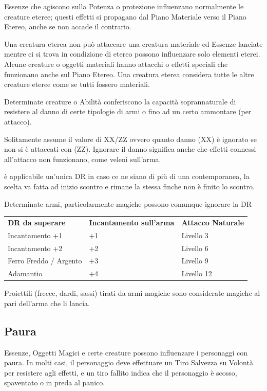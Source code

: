 \documentclass[a4paper,11pt,twoside,openany]{book}
\begin{document}
Essenze che agiscono sulla Potenza o protezione influenzano normalmente le creature eteree; questi effetti si propagano dal Piano Materiale verso il Piano Etereo, anche se non accade il contrario.

Una creatura eterea non può attaccare una creatura materiale ed Essenze lanciate mentre ci si trova in condizione di etereo possono influenzare solo elementi eterei. Alcune creature o oggetti materiali hanno attacchi o effetti speciali che funzionano anche sul Piano Etereo. Una creatura eterea considera tutte le altre creature eteree come se tutti fossero materiali.


Determinate creature o Abilità conferiscono la capacità soprannaturale di resistere al danno di certe tipologie di armi o fino ad un certo ammontare (per attacco).

Solitamente assume il valore di XX/ZZ ovvero quanto danno (XX) è ignorato se non si è attaccati con (ZZ). Ignorare il danno significa anche che effetti connessi all'attacco non funzionano, come veleni sull'arma.

è applicabile un'unica DR in caso ce ne siano di più di una contemporanea, la scelta va fatta ad inizio scontro e rimane la stessa finche non è finito lo scontro.

Determinate armi, particolarmente magiche possono comunque ignorare la DR 

\bigskip

\begin{tabular}{lll}
	\toprule
	\textbf{DR da superare} & \textbf{Incantamento sull'arma} & \textbf{Attacco Naturale}\tabularnewline
	Incantamento +1         & +1                              & Livello 3\tabularnewline
	Incantamento +2         & +2                              & Livello 6\tabularnewline
	Ferro Freddo / Argento  & +3                              & Livello 9\tabularnewline
	Adamantio               & +4                              & Livello 12\tabularnewline
\end{tabular}

Proiettili (frecce, dardi, sassi) tirati da armi magiche sono considerate
magiche al pari dell'arma che li lancia.



\subsection{Paura}

\label{paura}

Essenze, Oggetti Magici e certe creature possono influenzare i personaggi con paura. In molti casi, il personaggio deve effettuare un Tiro Salvezza su Volontà per resistere agli effetti, e un tiro fallito indica che il personaggio è scosso, spaventato o in preda al panico.
\end{document}
